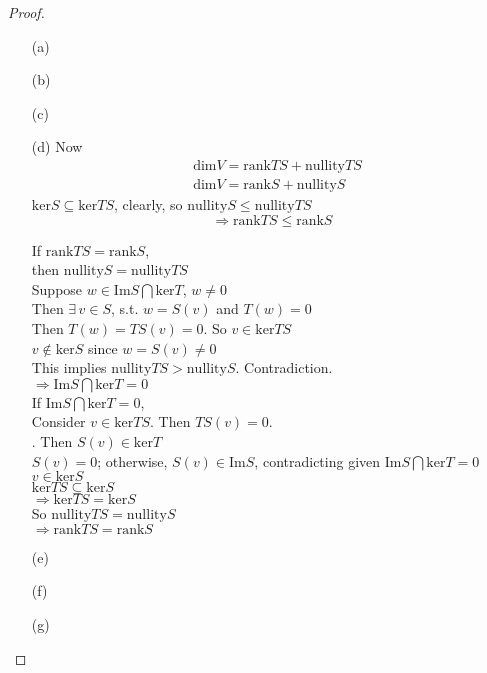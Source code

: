 \begin{proof}
\begin{enumerate}
\item[(a)]
\item[(b)]
\item[(c)]
\item[(d)] Now 
\[
\begin{aligned}
  & \text{dim}V = \text{rank}TS + \text{nullity}TS \\ 
  &  \text{dim}V = \text{rank}S + \text{nullity}S
\end{aligned}
\]
$\text{ker}S \subseteq \text{ker}TS$, clearly, so $\text{nullity}S \leq \text{nullity}TS$ 
\[
\Longrightarrow \boxed{ \text{rank}TS \leq \text{rank}S } 
\]

If $\text{rank}TS = \text{rank}S$, \\
\phantom{ \quad } then $\text{nullity}S = \text{nullity}TS$ \\
\phantom{ \, } Suppose $w \in \text{Im}S \bigcap \text{ker}T$, $w \neq 0$ \\
\phantom{ \quad } Then $\exists \,  v\in S$, s.t. $w = S(v)$ and $T(w)=0$ \\
\phantom{ \quad \, } Then $T(w) = TS(v) =0$.  So $v\in \text{ker}TS$ \\
\phantom{ \quad \quad \, } $v\notin \text{ker}S$ since $w = S(v) \neq 0$ \\
\phantom{ \quad \quad \, } This implies $\text{nullity}TS > \text{nullity}S$.  Contradiction. \\
$\Longrightarrow \text{Im}S \bigcap \text{ker}T =0$ \\

If $\text{Im}S \bigcap \text{ker}T =0$, \\
\phantom{ \quad } Consider $v \in \text{ker}TS$.  Then $TS(v)=0$.  \\
.  Then $S(v)  \in \text{ker}T$ \\
\phantom{ \quad  } $S(v) =0$; otherwise, $S(v) \in \text{Im}S$, contradicting given $\text{Im}S \bigcap \text{ker}T =0$ \\
\phantom{ \quad \quad } $v\in \text{ker}S$ \\

$\text{ker}TS \subseteq \text{ker}S$\\
$\Longrightarrow \text{ker}TS = \text{ker}S$ \\
So $\text{nullity}TS = \text{nullity}S$  \\
$\Longrightarrow \text{rank}TS = \text{rank}S$ 

\item[(e)]
\item[(f)]
\item[(g)]
\end{enumerate}
\end{proof}



